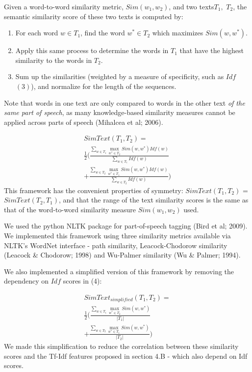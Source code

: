 \documentclass[letterpaper, 10 pt, conference]{ieeeconf}  %
\DeclareMathOperator*{\maxU}{max}
\begin{document}
Given a word-to-word similarity metric, $Sim(w_1, w_2)$, and two texts\footnotemark[4] $T_1,$ $T_2$, the semantic similarity score of these two texts is computed by:
\begin{enumerate}
\item For each word $w \in T_1$, find the word $w^* \in T_2$ which maximizes $Sim(w, w^*)$.
\item Apply this same process to determine the words in $T_1$ that have the highest similarity to the words in $T_2$. 
\item Sum up the similarities (weighted by a measure of specificity, such as $Idf$ $(3)$), and normalize for the length of the sequences. 
\end{enumerate}
Note that words in one text are only compared to words in the other text \emph{of the same part of speech}, as many knowledge-based similarity measures cannot be applied across parts of speech (Mihalcea et al; 2006).

\begin{gather*} \tag{8}
SimText(T_1,T_2) = \\ \frac{1}{2}\Big( \frac{\sum_{w \in T_1}{\maxU_{w^* \in T_2}Sim(w,w^*)Idf(w)}}{\sum_{w \in T_1}Idf(w)} \\ + \frac{\sum_{w \in T_2}{\maxU_{w^* \in T_1}Sim(w,w^*)Idf(w)}}{\sum_{w \in T_2}Idf(w)} \Big)
\end{gather*}
This framework has the convenient properties of symmetry: $SimText(T_1, T_2)$ = $SimText(T_2, T_1)$, and that the range of the text similarity scores is the same as that of the word-to-word similarity measure  $Sim(w_1, w_2)$ used. 

We used the python NLTK package for part-of-speech tagging (Bird et al; 2009). We implemented this framework using three similarity metrics available via NLTK’s WordNet interface - path similarity, Leacock-Chodorow similarity (Leacock \& Chodorow; 1998) and Wu-Palmer similarity (Wu \& Palmer; 1994). 

We also implemented a simplified version of this framework by removing the dependency on $Idf$ scores in (4):

\begin{gather*} \tag{9}
SimText_{simplified}(T_1,T_2) = \\ \frac{1}{2}\Big( \frac{\sum_{w \in T_1}{\maxU_{w^* \in T_2}Sim(w,w^*)}}{|T_1|} \\ + \frac{\sum_{w \in T_2}{\maxU_{w^* \in T_1}Sim(w,w^*)}}{|T_2|} \Big)
\end{gather*}
We made this simplification to reduce the correlation between these similarity scores and the Tf-Idf features proposed in section 4.B - which also depend on Idf scores.
\end{document}
